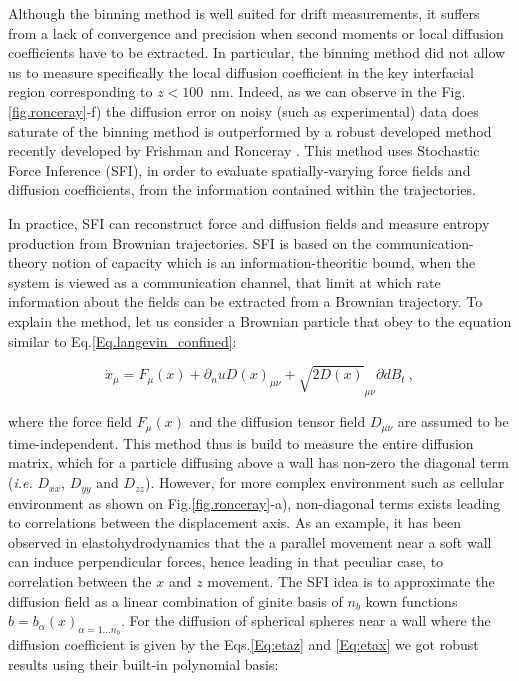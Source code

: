 Although the binning method is well suited for drift measurements, it suffers from a lack of convergence and precision when second moments or local diffusion coefficients have to be extracted. In particular, the binning method did not allow us to measure specifically the local diffusion coefficient in the key interfacial region corresponding to $z<100$~nm. Indeed, as we can observe in the Fig.\ref{fig.ronceray}-f) the diffusion error on noisy (such as experimental) data does saturate of the binning method is outperformed by a robust developed method  recently developed by Frishman and Ronceray \cite{frishman_learning_2020}. This method uses Stochastic Force Inference (\gls{SFI}), in order to evaluate spatially-varying force fields and diffusion coefficients, from the information contained within the trajectories. 

In practice, \gls{SFI} can reconstruct force and diffusion fields and measure entropy production from Brownian trajectories. \gls{SFI} is based on the communication-theory notion of capacity which is an information-theoritic bound, when the system is viewed as a communication channel, that limit at which rate information about the fields can be extracted from a Brownian trajectory. To explain the method, let us consider a Brownian particle that obey to the equation similar to Eq.\ref{Eq.langevin_confined}:

\begin{equation}
	\dot{x}_\mu = F_\mu (x) + \partial_nu D(x)_{\mu \nu} + \sqrt{2D(x)}_{\mu \nu} \partial{d}B_t~,
\end{equation}

where  the force field $F_\mu (x)$ and the diffusion tensor field $D_{\mu \nu}$ are assumed to be time-independent. This method thus is build to measure the entire diffusion matrix, which for a particle diffusing above a wall has non-zero the diagonal term (\textit{i.e.} $D_{xx}$, $D_{yy}$ and $D_{zz}$). However, for more complex environment such as cellular environment as shown on Fig.\ref{fig.ronceray}-a), non-diagonal terms exists leading to correlations between the displacement axis. As an example, it has been observed in elastohydrodynamics \cite{saintyves_self-sustained_2016} that the a parallel movement near a soft wall can induce perpendicular forces, hence leading in that peculiar case, to correlation between the $x$ and $z$ movement. The \gls{SFI} idea is to approximate the diffusion field as a linear combination of ginite basis of $n_b$ kown functions $b={b_\alpha (x)}_{\alpha = 1...n_b}$. For the diffusion of spherical spheres near a wall where the diffusion coefficient is given by the Eqs.\ref{Eq:etaz} and \ref{Eq:etax} we got robust results using their built-in polynomial basis:

